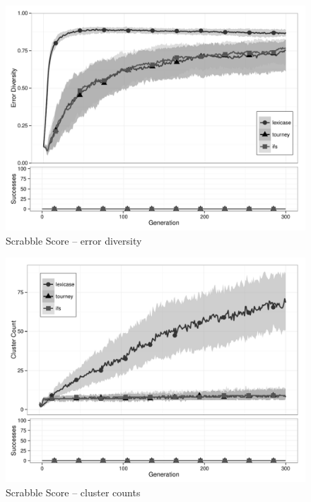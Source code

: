 \begin{figure}[p] %
\centering
\includegraphics[width=11.5cm]{scrabble-score-diversity.pdf}
\caption{Scrabble Score -- error diversity}
\label{scrabble-scoreDiv}
\end{figure}

\begin{figure}[p] %
\centering
\includegraphics[width=11.5cm]{scrabble-score-cluster.pdf}
\caption{Scrabble Score -- cluster counts}
\label{scrabble-scoreClu}
\end{figure}

